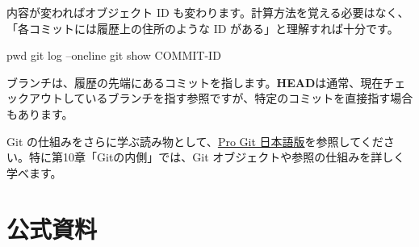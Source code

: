 \documentclass[a4paper,11pt]{jlreq}
\newcommand{\term}[1]{\textbf{#1}}
\begin{document}
内容が変わればオブジェクト ID も変わります。計算方法を覚える必要はなく、「各コミットには履歴上の住所のような ID がある」と理解すれば十分です。

\begin{codeblock}
pwd
git log --oneline
git show COMMIT-ID
\end{codeblock}

ブランチは、履歴の先端にあるコミットを指します。\term{HEAD}は通常、現在チェックアウトしているブランチを指す参照ですが、特定のコミットを直接指す場合もあります。

Git の仕組みをさらに学ぶ読み物として、\href{https://git-scm.com/book/ja/v2}{Pro Git 日本語版}を参照してください。特に第10章「Gitの内側」では、Git オブジェクトや参照の仕組みを詳しく学べます。

\section{公式資料}

\nocite{*}
\printbibliography[heading=none]
\end{document}
